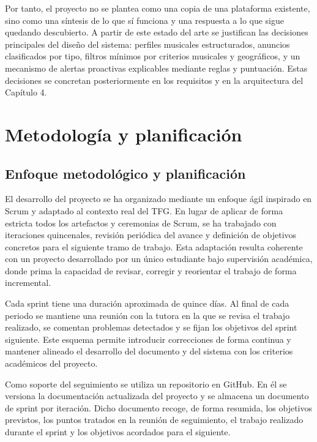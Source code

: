 \documentclass[12pt,a4paper]{report}
\begin{document}
Por tanto, el proyecto no se plantea como una copia de una plataforma existente, sino como una síntesis de lo que sí funciona y una respuesta a lo que sigue quedando descubierto. A partir de este estado del arte se justifican las decisiones principales del diseño del sistema: perfiles musicales estructurados, anuncios clasificados por tipo, filtros mínimos por criterios musicales y geográficos, y un mecanismo de alertas proactivas explicables mediante reglas y puntuación. Estas decisiones se concretan posteriormente en los requisitos y en la arquitectura del Capítulo 4.

\chapter{Metodología y planificación}

\section{Enfoque metodológico y planificación}
El desarrollo del proyecto se ha organizado mediante un enfoque ágil inspirado en Scrum y adaptado al contexto real del TFG. En lugar de aplicar de forma estricta todos los artefactos y ceremonias de Scrum, se ha trabajado con iteraciones quincenales, revisión periódica del avance y definición de objetivos concretos para el siguiente tramo de trabajo. Esta adaptación resulta coherente con un proyecto desarrollado por un único estudiante bajo supervisión académica, donde prima la capacidad de revisar, corregir y reorientar el trabajo de forma incremental.

Cada sprint tiene una duración aproximada de quince días. Al final de cada periodo se mantiene una reunión con la tutora en la que se revisa el trabajo realizado, se comentan problemas detectados y se fijan los objetivos del sprint siguiente. Este esquema permite introducir correcciones de forma continua y mantener alineado el desarrollo del documento y del sistema con los criterios académicos del proyecto.

Como soporte del seguimiento se utiliza un repositorio en GitHub. En él se versiona la documentación actualizada del proyecto y se almacena un documento de sprint por iteración. Dicho documento recoge, de forma resumida, los objetivos previstos, los puntos tratados en la reunión de seguimiento, el trabajo realizado durante el sprint y los objetivos acordados para el siguiente.
\end{document}
